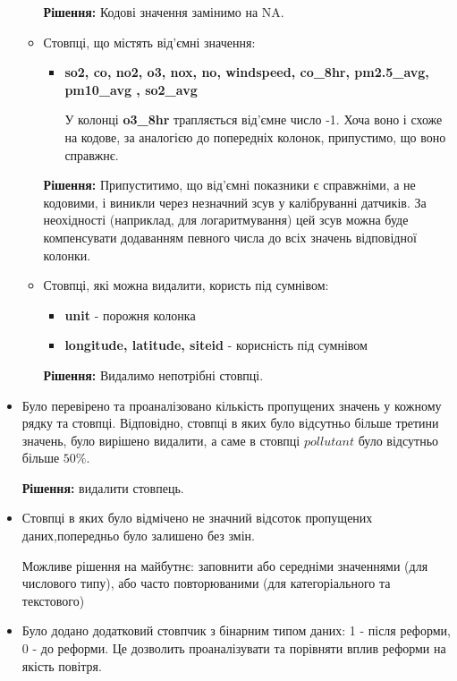\documentclass{article}
\begin{document}
\begin{itemize}
\begin{itemize}
            \textbf{ Рішення:} Кодові значення замінимо на NA.

             \item Стовпці, що містять від'ємні значення:
             \begin{itemize}
                \item \textbf{so2, co, no2,  o3, nox, no, windspeed, co\_8hr, pm2.5\_avg, pm10\_avg , so2\_avg} 

                У колонці \textbf{o3\_8hr} трапляється від'ємне число -1. Хоча воно і схоже на кодове, за аналогією до попередніх колонок, припустимо, що воно справжнє.
             \end{itemize}

             \textbf{Рішення:} Припуститимо, що від'ємні показники є справжніми, а не кодовими, і виникли через незначний зсув у калібруванні датчиків. За неохідності (наприклад, для логаритмування) цей зсув можна буде компенсувати додаванням певного числа до всіх значень відповідної колонки.
             
             \item Стовпці, які можна видалити, користь під сумнівом:
             \begin{itemize}
                 \item \textbf{unit} - порожня колонка
                 \item \textbf{longitude, latitude, siteid}  - корисність під сумнівом
             \end{itemize}
             
             \textbf{Рішення:} Видалимо непотрібні стовпці.
         \end{itemize}
    
    \item Було перевірено та проаналізовано кількість пропущених значень у кожному рядку та стовпці. Відповідно, стовпці в яких було відсутньо більше третини значень, було вирішено видалити, а саме в стовпці $pollutant$ було відсутньо більше $50\%$.
    
    \textbf{Рішення:} видалити стовпець.
    
    \item Стовпці в яких було відмічено не значний відсоток пропущених даних,попередньо було залишено без змін. 
    
    Можливе рішення на майбутнє: заповнити або середніми значеннями (для числового типу), або часто повторюваними (для категоріального та текстового) 
    
    \item Було додано додатковий стовпчик з бінарним типом даних: 1 - після реформи, 0 - до реформи. Це дозволить проаналізувати та порівняти вплив реформи на якість повітря.
\end{itemize}
\end{document}
